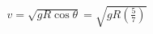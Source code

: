 \documentclass[preview]{standalone}
\begin{document}
\begin{align*}
v = \sqrt{gR\cos\theta} = \sqrt{gR\left(\frac{5}{7}\right)}
\end{align*}
\end{document}
